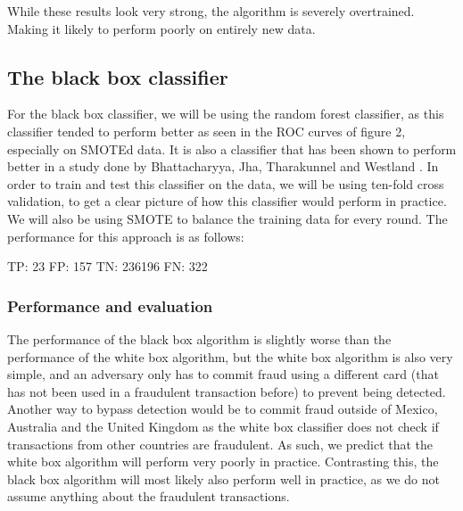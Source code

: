 \documentclass[]{article}
\begin{document}
While these results look very strong, the algorithm is severely overtrained. Making it likely to perform poorly on entirely new data.

\clearpage
\subsection{The black box classifier}
For the black box classifier, we will be using the random forest classifier, as this classifier tended to perform better as seen in the ROC curves of figure 2, especially on SMOTEd data. It is also a classifier that has been shown to perform better in a study done by Bhattacharyya, Jha, Tharakunnel and Westland \cite{bhattacharyya2011data}. In order to train and test this classifier on the data, we will be using ten-fold cross validation, to get a clear picture of how this classifier would perform in practice. We will also be using SMOTE to balance the training data for every round. The performance for this approach is as follows:

\begin{flushleft}
	TP: 23 \newline
	FP: 157  \newline
	TN: 236196 \newline
	FN: 322 \newline
\end{flushleft}
\subsubsection{Performance and evaluation}
The performance of the black box algorithm is slightly worse than the performance of the white box algorithm, but the white box algorithm is also very simple, and an adversary only has to commit fraud using a different card (that has not been used in a fraudulent transaction before) to prevent being detected. Another way to bypass detection would be to commit fraud outside of Mexico, Australia and the United Kingdom as the white box classifier does not check if transactions from other countries are fraudulent. As such, we predict that the white box algorithm will perform very poorly in practice. Contrasting this, the black box algorithm will most likely also perform well in practice, as we do not assume anything about the fraudulent transactions.
\clearpage
\end{document}

